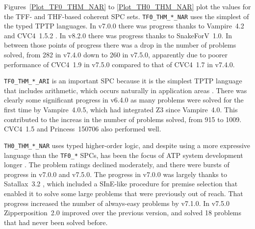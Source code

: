 \documentclass[runningheads]{llncs}
\begin{document}
Figures~\ref{Plot_TF0_THM_NAR} to \ref{Plot_TH0_THM_NAR} plot the values for the TFF- and
THF-based coherent SPC sets.
{\tt TF0\_THM\_*\_NAR} uses the simplest of the typed TPTP languages.
In v7.0.0 there was progress thanks to Vampire~4.2 and CVC4~1.5.2 \cite{BC+11}.
In v8.2.0 there was progress thanks to SnakeForV~1.0.
In between those points of progress there was a drop in the number of problems solved, from
282 in v7.4.0 down to 260 in v7.5.0, apparently due to poorer performance of CVC4~1.9
in v7.5.0 compared to that of CVC4~1.7 in v7.4.0.

{\tt TF0\_THM\_*\_ARI} is an important SPC because it is the simplest TPTP language that 
includes arithmetic, which occurs naturally in application areas \cite{KK+23,BF+15,PB10}.
There was clearly some significant progress in v6.4.0 as many problems were solved for the
first time by Vampire~4.0.5, which had integrated Z3 \cite{dMB08} since Vampire~4.0.
This contributed to the increas in the number of problems solved, from 915 to 1009.
CVC4~1.5 \cite{BC+11} and Princess~150706 \cite{Rue08} also performed well.

{\tt TH0\_THM\_*\_NAR} uses typed higher-order logic, and despite using a more expressive
language than the {\tt TF0\_*} SPCs, has been the focus of ATP system development longer 
\cite{SB10,SS+12}.
The problem ratings declined moderately, and there were bursts of progress in v7.0.0 and v7.5.0.
The progress in v7.0.0 was largely thanks to Satallax~3.2 \cite{Bro12}, which included a SInE-like 
\cite{HV11} procedure for premise selection that enabled it to solve some large problems that 
were previously out of reach. 
That progress increased the number of always-easy problems by v7.1.0.
In v7.5.0 Zipperposition~2.0 \cite{BB+19-CADE} improved over the previous version, and solved
18 problems that had never been solved before.
\end{document}
